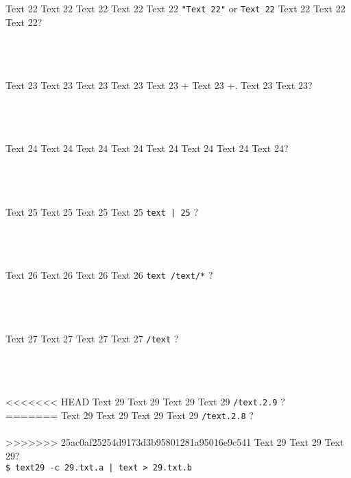 \documentclass[9pt]{exam}
\begin{document}
\begin{questions}
\question
    Text 22 Text 22 Text 22 Text 22 Text 22 \texttt{"Text 22"}
    or
    \texttt{\textquotesingle{}Text 22\textquotesingle{}}
    Text 22 Text 22 Text 22?\\\\
    \makebox[0.9\textwidth]{\$ \enspace\hrulefill}\\\\
    \makebox[0.9\textwidth]{\enspace\hrulefill}

\question
    Text 23 Text 23 Text 23 Text 23 Text 23 \Ctrl+
    Text 23 \Ctrl+. Text 23 Text 23?\\\\
    \makebox[0.9\textwidth]{\$ \enspace\hrulefill}\\\\
    \makebox[0.9\textwidth]{\enspace\hrulefill}

\question
    Text 24 Text 24 Text 24 Text 24 Text 24 Text 24 Text 24 Text 24?\\\\
    \makebox[0.9\textwidth]{\$ \enspace\hrulefill}\\\\
    \makebox[0.9\textwidth]{\enspace\hrulefill}

\question
    Text 25 Text 25 Text 25 Text 25 \textquotesingle{}\texttt{text | 25}\textquotesingle{} ?\\\\
    \makebox[0.9\textwidth]{\$ \enspace\hrulefill}\\\\
    \makebox[0.9\textwidth]{\enspace\hrulefill}

\question
    Text 26 Text 26 Text 26 Text 26 \textquotesingle{}\texttt{text /text/*}\textquotesingle{} ?\\\\
    \makebox[0.9\textwidth]{\$ \enspace\hrulefill}\\\\
    \makebox[0.9\textwidth]{\enspace\hrulefill}

\question
    Text 27 Text 27 Text 27 Text 27 \texttt{/text} ?\\\\
    \makebox[0.9\textwidth]{\$ \enspace\hrulefill}\\\\
    \makebox[0.9\textwidth]{\enspace\hrulefill}

\question
<<<<<<< HEAD
    Text 29 Text 29 Text 29 Text 29 \texttt{/text.2.9} ?\\
=======
    Text 29 Text 29 Text 29 Text 29 \texttt{/text.2.8} ?\\\\
>>>>>>> 25ac0af25254d9173d3b95801281a95016e9c541
    Text 29 Text 29 Text 29?\\
    \makebox[0.05\textwidth]{}
    \texttt{\$ text29 -c 29.txt.a | text > 29.txt.b}\\\\
    \makebox[0.9\textwidth]{\$ \enspace\hrulefill}\\\\
    \makebox[0.9\textwidth]{\enspace\hrulefill}


\end{questions}
\end{document}
